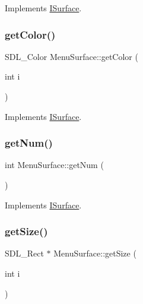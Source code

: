 Implements \mbox{\hyperlink{class_i_surface_a45bacb1ffa6f0835e3ece0123b90c4fc}{I\+Surface}}.

\mbox{\label{class_menu_surface_a2fa22cd43ecf4f0ca4749f7d95ca771a}} 
\subsubsection{\texorpdfstring{get\+Color()}{getColor()}}
{\footnotesize\ttfamily S\+D\+L\+\_\+\+Color Menu\+Surface\+::get\+Color (\begin{DoxyParamCaption}\item[{int}]{i }\end{DoxyParamCaption})\hspace{0.3cm}{\ttfamily [virtual]}}



Implements \mbox{\hyperlink{class_i_surface_adf609edb8f871bf37ed9aaf8fe0d2695}{I\+Surface}}.

\mbox{\label{class_menu_surface_a6533d04f9c2f57bfffb58d461070e61f}} 
\subsubsection{\texorpdfstring{get\+Num()}{getNum()}}
{\footnotesize\ttfamily int Menu\+Surface\+::get\+Num (\begin{DoxyParamCaption}{ }\end{DoxyParamCaption})\hspace{0.3cm}{\ttfamily [virtual]}}



Implements \mbox{\hyperlink{class_i_surface_a1553f92deac310771e6fe63d62fc1d95}{I\+Surface}}.

\mbox{\label{class_menu_surface_a80f484cceafba5c53ff4cf2b07db0c3b}} 
\subsubsection{\texorpdfstring{get\+Size()}{getSize()}}
{\footnotesize\ttfamily S\+D\+L\+\_\+\+Rect $\ast$ Menu\+Surface\+::get\+Size (\begin{DoxyParamCaption}\item[{int}]{i }\end{DoxyParamCaption})\hspace{0.3cm}{\ttfamily [virtual]}}



